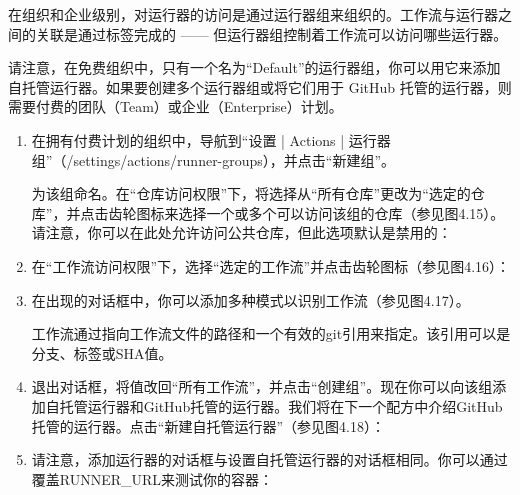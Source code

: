 在组织和企业级别，对运行器的访问是通过运行器组来组织的。工作流与运行器之间的关联是通过标签完成的 —— 但运行器组控制着工作流可以访问哪些运行器。


请注意，在免费组织中，只有一个名为“Default”的运行器组，你可以用它来添加自托管运行器。如果要创建多个运行器组或将它们用于 GitHub 托管的运行器，则需要付费的团队（Team）或企业（Enterprise）计划。


\begin{enumerate}
\item 
在拥有付费计划的组织中，导航到“设置 | Actions | 运行器组”（/settings/actions/runner-groups），并点击“新建组”。

为该组命名。在“仓库访问权限”下，将选择从“所有仓库”更改为“选定的仓库”，并点击齿轮图标来选择一个或多个可以访问该组的仓库（参见图4.15）。请注意，你可以在此处允许访问公共仓库，但此选项默认是禁用的：


\item 
在“工作流访问权限”下，选择“选定的工作流”并点击齿轮图标（参见图4.16）：


\item 
在出现的对话框中，你可以添加多种模式以识别工作流（参见图4.17）。


工作流通过指向工作流文件的路径和一个有效的git引用来指定。该引用可以是分支、标签或SHA值。

\item 
退出对话框，将值改回“所有工作流”，并点击“创建组”。现在你可以向该组添加自托管运行器和GitHub托管的运行器。我们将在下一个配方中介绍GitHub托管的运行器。点击“新建自托管运行器”（参见图4.18）：


\item 
请注意，添加运行器的对话框与设置自托管运行器的对话框相同。你可以通过覆盖RUNNER\_URL来测试你的容器：



\end{enumerate}
